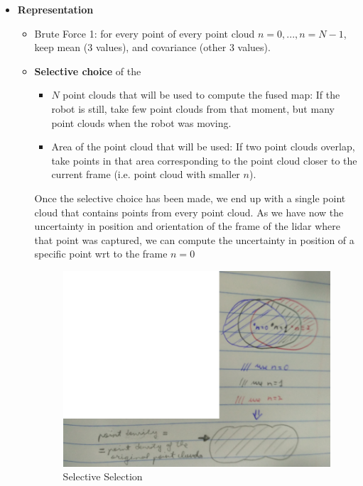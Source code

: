 \documentclass[letterpaper, 10 pt, conference]{ieeeconf}  %
\begin{document}
\begin{itemize}
    \item \textbf{Representation}
    \begin{itemize}
		\item Brute Force 1: for every point of every point cloud $n=0,...,n=N-1$, keep mean (3 values), and covariance (other 3 values).
		
		\item \textbf{Selective choice} of the 
		
		\begin{itemize}
		    \item $N$ point clouds that will be used to compute the fused map: If the robot is still, take few point clouds from that moment, but many point clouds when the robot was moving.  
		    \item Area of the point cloud that will be used: If two point clouds overlap, take points in that area corresponding to the point cloud closer to the current frame (i.e. point cloud with smaller $n$).
		\end{itemize}
		
		Once the selective choice has been made, we end up with a single point cloud that contains points from every point cloud. As we have now the uncertainty in position and orientation of the frame of the lidar where that point was captured, we can compute the uncertainty in position of a specific point wrt to the frame $n=0$
		
		\begin{figure}
		    \centering
		    \includegraphics[width=\columnwidth]{./figs/traversability3.PNG}
		    \caption{Selective Selection}
		    \label{fig:my_label}
		\end{figure}
		

\end{itemize}
\end{itemize}
\end{document}
